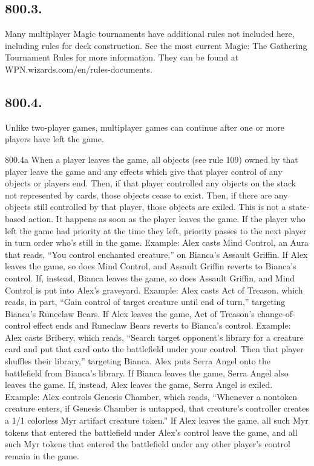 \subsection*{800.3.}
Many multiplayer Magic tournaments have additional rules not included here, including rules for deck construction. See the most current Magic: The Gathering Tournament Rules for more information. They can be found at WPN.wizards.com/en/rules-documents.

\subsection*{800.4.}
Unlike two-player games, multiplayer games can continue after one or more players have left the game.

800.4a When a player leaves the game, all objects (see rule 109) owned by that player leave the game and any effects which give that player control of any objects or players end. Then, if that player controlled any objects on the stack not represented by cards, those objects cease to exist. Then, if there are any objects still controlled by that player, those objects are exiled. This is not a state-based action. It happens as soon as the player leaves the game. If the player who left the game had priority at the time they left, priority passes to the next player in turn order who’s still in the game.
Example: Alex casts Mind Control, an Aura that reads, “You control enchanted creature,” on Bianca’s Assault Griffin. If Alex leaves the game, so does Mind Control, and Assault Griffin reverts to Bianca’s control. If, instead, Bianca leaves the game, so does Assault Griffin, and Mind Control is put into Alex’s graveyard.
Example: Alex casts Act of Treason, which reads, in part, “Gain control of target creature until end of turn,” targeting Bianca’s Runeclaw Bears. If Alex leaves the game, Act of Treason’s change-of-control effect ends and Runeclaw Bears reverts to Bianca’s control.
Example: Alex casts Bribery, which reads, “Search target opponent’s library for a creature card and put that card onto the battlefield under your control. Then that player shuffles their library,” targeting Bianca. Alex puts Serra Angel onto the battlefield from Bianca’s library. If Bianca leaves the game, Serra Angel also leaves the game. If, instead, Alex leaves the game, Serra Angel is exiled.
Example: Alex controls Genesis Chamber, which reads, “Whenever a nontoken creature enters, if Genesis Chamber is untapped, that creature’s controller creates a 1/1 colorless Myr artifact creature token.” If Alex leaves the game, all such Myr tokens that entered the battlefield under Alex’s control leave the game, and all such Myr tokens that entered the battlefield under any other player’s control remain in the game.

